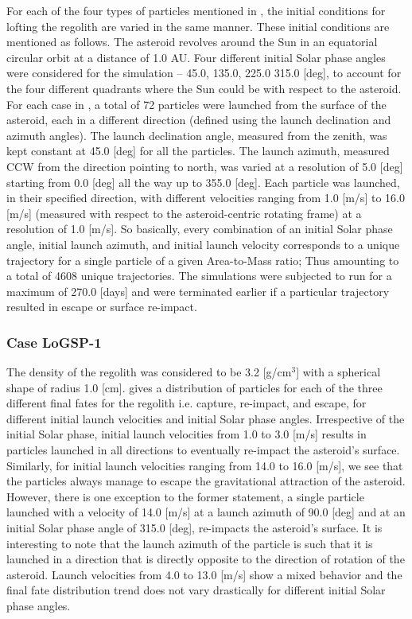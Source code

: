 For each of the four types of particles mentioned in , the initial conditions for lofting the regolith are varied in the same manner. These initial conditions are mentioned as follows. The asteroid revolves around the Sun in an equatorial circular orbit at a distance of 1.0 \gls{AU}. Four different initial Solar phase angles were considered for the simulation – 45.0, 135.0, 225.0 315.0 [deg], to account for the four different quadrants where the Sun could be with respect to the asteroid. For each case in , a total of 72 particles were launched from the surface of the asteroid, each in a different direction (defined using the launch declination and azimuth angles). The launch declination angle, measured from the zenith, was kept constant at 45.0 [deg] for all the particles. The launch azimuth, measured \gls{CCW} from the direction pointing to north, was varied at a resolution of 5.0 [deg] starting from 0.0 [deg] all the way up to 355.0 [deg]. Each particle was launched, in their specified direction, with different velocities ranging from 1.0 [m/s] to 16.0 [m/s] (measured with respect to the asteroid-centric rotating frame) at a resolution of 1.0 [m/s]. So basically, every combination of an initial Solar phase angle, initial launch azimuth, and initial launch velocity corresponds to a unique trajectory for a single particle of a given Area-to-Mass ratio; Thus amounting to a total of 4608 unique trajectories. The simulations were subjected to run for a maximum of 270.0 [days] and were terminated earlier if a particular trajectory resulted in escape or surface re-impact.

\subsubsection{Case LoGSP-1}
\label{LoGSP-1}
The density of the regolith was considered to be 3.2 [g/cm$^{3}$] with a spherical shape of radius 1.0 [cm].  gives a distribution of particles for each of the three different final fates for the regolith i.e. capture, re-impact, and escape, for different initial launch velocities and initial Solar phase angles. Irrespective of the initial Solar phase, initial launch velocities from 1.0 to 3.0 [m/s] results in particles launched in all directions to eventually re-impact the asteroid's surface. Similarly, for initial launch velocities ranging from 14.0 to 16.0 [m/s], we see that the particles always manage to escape the gravitational attraction of the asteroid. However, there is one exception to the former statement, a single particle launched with a velocity of 14.0 [m/s] at a launch azimuth of 90.0 [deg] and at an initial Solar phase angle of 315.0 [deg], re-impacts the asteroid's surface. It is interesting to note that the launch azimuth of the particle is such that it is launched in a direction that is directly opposite to the direction of rotation of the asteroid. Launch velocities from 4.0 to 13.0 [m/s] show a mixed behavior and the final fate distribution trend does not vary drastically for different initial Solar phase angles.

